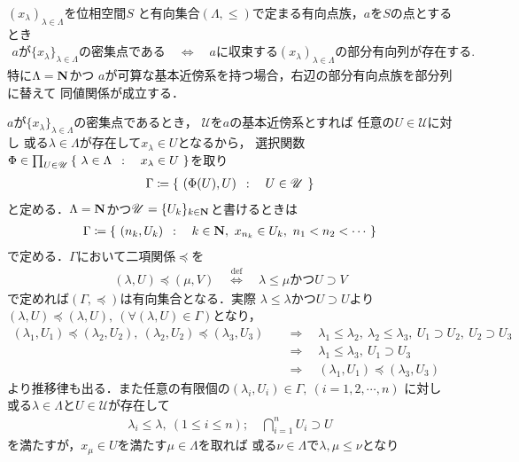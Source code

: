 	\begin{screen}
		\begin{thm}[有向点族の密集点に対する収束部分点族の存在]
			$(x_\lambda)_{\lambda \in \Lambda}$を位相空間$S$
			と有向集合$(\Lambda,\leq)$で定まる有向点族，$a$を$S$の点とするとき
			\begin{align}
				\mbox{$a$が$\{x_\lambda\}_{\lambda \in \Lambda}$の密集点である}
				\quad \Longleftrightarrow \quad
				\mbox{$a$に収束する$(x_\lambda)_{\lambda \in \Lambda}$の部分有向列が存在する}.
			\end{align}
			特に$\Lambda = \mathbf{N}$かつ
			$a$が可算な基本近傍系を持つ場合，右辺の部分有向点族を部分列に替えて
			同値関係が成立する．
		\end{thm}
	\end{screen}
	
	\begin{prf}
		$a$が$\{x_\lambda\}_{\lambda \in \Lambda}$の密集点であるとき，
		$\mathscr{U}$を$a$の基本近傍系とすれば
		任意の$U \in \mathscr{U}$に対し
		或る$\lambda \in \Lambda$が存在して$x_\lambda \in U$となるから，
		選択関数$\Phi \in \prod_{U \in \mathscr{U}} 
		\left\{\ \lambda \in \Lambda\ \, : \quad x_\lambda \in U\ \right\}$を取り
		\begin{align}
			\Gamma \coloneqq \left\{\ (\Phi(U),U)\ \, : \quad U \in \mathscr{U}\ \right\}
		\end{align}
		と定める．$\Lambda = \mathbf{N}$かつ$\mathscr{U} = \{U_k\}_{k \in \mathbf{N}}$と書けるときは
		\begin{align}
			\Gamma \coloneqq \left\{\ (n_k,U_k)\ \, : \quad k \in \mathbf{N},\ x_{n_k} \in U_k,\ n_1 < n_2 < \cdots\ \right\}
		\end{align}
		で定める．$\Gamma$において二項関係$\preceq$を
		\begin{align}
			(\lambda,U) \preceq (\mu,V) 
			\quad \overset{\mathrm{def}}{\Longleftrightarrow} \quad
			\mbox{$\lambda \leq \mu$かつ$U \supset V$}
		\end{align}
		で定めれば$(\Gamma,\preceq)$は有向集合となる．実際
		$\lambda \leq \lambda$かつ$U \supset U$より
		$(\lambda,U) \preceq (\lambda,U),\ (\forall (\lambda,U) \in \Gamma)$となり，
		\begin{align}
			(\lambda_1,U_1) \preceq (\lambda_2,U_2),\
			(\lambda_2,U_2) \preceq (\lambda_3,U_3) 
			&\quad \Longrightarrow \quad
			\lambda_1 \leq \lambda_2,\ \lambda_2 \leq \lambda_3,
			\ U_1 \supset U_2,\ U_2 \supset U_3 \\
			&\quad \Longrightarrow \quad
			\lambda_1 \leq \lambda_3,\ U_1 \supset U_3 \\
			&\quad \Longrightarrow \quad
			(\lambda_1,U_1) \preceq (\lambda_3,U_3)
		\end{align}
		より推移律も出る．また任意の有限個の$(\lambda_i,U_i) \in \Gamma,\ (i=1,2,\cdots,n)$
		に対し或る$\lambda \in \Lambda$と$U \in \mathscr{U}$が存在して
		\begin{align}
			\lambda_i \leq \lambda,\ (1 \leq i \leq n);
			\quad \bigcap_{i=1}^n U_i \supset U
		\end{align}
		を満たすが，$x_\mu \in U$を満たす$\mu \in \Lambda$を取れば
		或る$\nu \in \Lambda$で$\lambda,\mu \leq \nu$となり
		

\end{prf}
